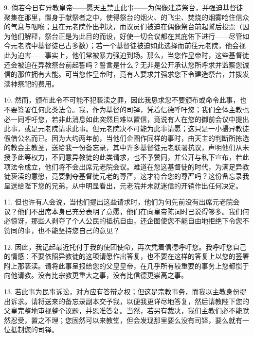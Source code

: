 9. 倘若今日有异教皇帝——愿天主禁止此事——为偶像建造祭台，并强迫基督徒聚集在那里，置身于献祭者之中，使得祭台的烟火、的飞尘、焚烧的烟雾呛住信众的气息与咽喉；且在元老院作出判决，而议员们被迫在偶像祭台前起誓后投票（因为他们解释，祭台正是为此目的而设，好使一切会议都在其庇佑下进行——尽管如今元老院中基督徒已占多数）；若一个基督徒被迫如此选择而前往元老院，他会视此为迫害——事实上，他们常被暴力强迫到场。那么，当您作皇帝时，这些基督徒还会被迫在异教祭台前起誓吗？誓言是什么？无非是公开承认您所呼求并监察您诚信的那位拥有大能。可当您作皇帝时，竟有人要求并强求您下令建造祭台，并拨发渎神祭祀的费用。\par

10. 然而，颁布此令不可能不犯亵渎之罪，因此我恳求您不要颁布或命令此事，也不要签署任何此类法令。我，作为基督的司铎，凭着信德呼吁您；我们全体主教也必一同呼吁您，若非此消息如此突然且难以置信，竟说有人在您的御前会议中提出此事，或是元老院请求此事。但元老院决不可能为此事请愿；这只是一小撮异教徒假借公名而已。因为大约两年前，当他们企图作同样的事时，由天主的判断所拣选的教会主教圣，送给我一份备忘录，其中许多基督徒元老联署抗议，声明他们从未授予此等权力，不同意异教徒的此类请求，也不予赞同，并公开与私下宣布，若此项法令成立，他们将不会出席元老院会议。难道在您这基督徒的时代，为满足异教徒亵渎的意愿，竟要剥夺基督徒元老的尊严，这才符合您的尊严吗？这份备忘录我呈送给陛下您的兄弟，从中明显看出，元老院并未就迷信的开销作出任何决定。\par

11. 但也许有人会说，当他们提出这些请求时，他们为何先前没有出席元老院会议？他们不出席本身已充分表明了意愿，他们在向皇帝陈词时已说得够多。我们何必惊讶，那些人剥夺了个人公民的抵抗自由，还企图使您不能自由地拒绝下令您不赞同的事，也不能坚持您自己的意见？\par

12. 因此，我记起最近托付于我的使团使命，再次凭着信德呼吁您。我呼吁您自己的情感：不要依照异教徒的这项请愿作出答复，也不要在这样的答复上以您的签署附上那亵渎。请将此事呈报给您的父皇皇帝，在几乎所有较重要的事务上您都惯于向他请教。没有比宗教更重大之事，没有比信德更崇高之事。\par

13. 若此事为民事诉讼，对方应有答辩之权；但这是宗教事务，而我以主教身份提出诉求。请将送来的备忘录副本交予我，以便我更详尽地答复，然后请教陛下您的父皇完整地审视整个议题，并恩准答复。当然，若另有裁决，我们主教们必不能默然忍受，置之不理；您固然可以来教堂，但会发现那里要么没有司铎，要么就有一位抵制您的司铎。\par

